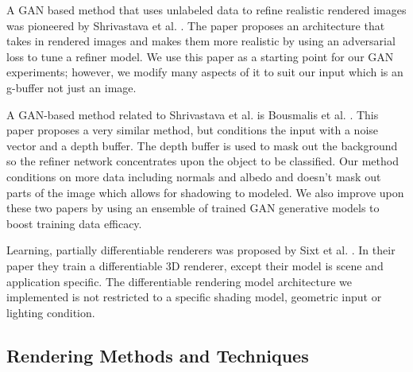 \documentclass[10pt,twocolumn,letterpaper]{article}
\begin{document}
A GAN based method that uses unlabeled data to refine realistic rendered images was pioneered by
Shrivastava et al. \cite{DBLP:journals/corr/ShrivastavaPTSW16}. The paper proposes an architecture that takes in rendered images and makes them more realistic by using an adversarial loss to tune a refiner model. We use this paper as a starting point for our GAN experiments; however, we modify many aspects of it to suit our input which is an g-buffer not just an image.

A GAN-based method related to Shrivastava et al. is Bousmalis et al. \cite{Bousmalis2016UnsupervisedPD}. This paper proposes a very similar method, but conditions the input with a noise vector and a depth buffer.  The depth buffer is used to mask out the background so the refiner network concentrates upon the object to be classified.  Our method conditions on more data including normals and albedo and doesn't mask out parts of the image which allows for shadowing to modeled. We also improve upon these two papers by using an ensemble of trained GAN generative models to boost training data efficacy.

Learning, partially differentiable renderers was proposed by Sixt et al. \cite{DBLP:journals/corr/SixtWL17}. In their paper they train a differentiable 3D renderer, except their model is scene and application specific. The differentiable rendering model architecture we implemented is not restricted to a specific shading model, geometric input or lighting condition.


\subsection{Rendering Methods and Techniques}
\end{document}
